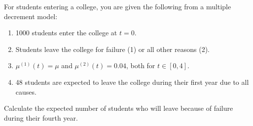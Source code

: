 For students entering a college, you are given the following from a multiple decrement
model:
\begin{enumerate}
\item 1000 students enter the college at $t = 0 .$
\item Students leave the college for failure (1) or all other reasons (2).
\item $\mu^{(1)}(t) = \mu$ and $\mu^{(2)}(t) = 0.04$, both for $t\in[0,4]$.
\item 48 students are expected to leave the college during their first year due to all causes.
\end{enumerate}
Calculate the expected number of students who will leave because of failure during their
fourth year.
